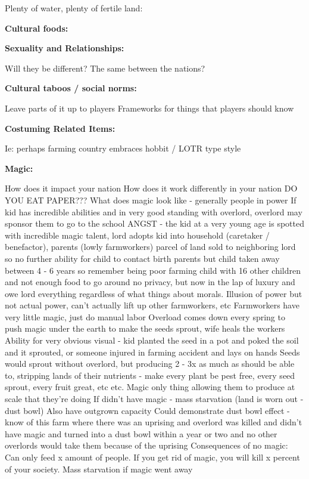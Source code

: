 \documentclass[blue]{GL2020}
\begin{document}
Plenty of water, plenty of fertile land:

\textbf{Cultural foods:}

\textbf{Sexuality and Relationships:}

Will they be different? The same between the nations?

\textbf{Cultural taboos / social norms:}

Leave parts of it up to players
Frameworks for things that players should know

\textbf{Costuming Related Items:}

Ie: perhaps farming country embraces hobbit / LOTR type style

\textbf{Magic:}

How does it impact your nation
How does it work differently in your nation
DO YOU EAT PAPER???
What does magic look like - generally people in power
If kid has incredible abilities and in very good standing with overlord, overlord may sponsor them to go to the school
ANGST - the kid at a very young age is spotted with incredible magic talent, lord adopts kid into household (caretaker / benefactor), parents (lowly farmworkers) parcel of land sold to neighboring lord so no further ability for child to contact birth parents but child taken away between 4 - 6 years so remember being poor farming child with 16 other children and not enough food to go around no privacy, but now in the lap of luxury and owe lord everything regardless of what things about morals.  
Illusion of power but not actual power, can’t actually lift up other farmworkers, etc
Farmworkers have very little magic, just do manual labor
Overload comes down every spring to push magic under the earth to make the seeds sprout, wife heals the workers
Ability for very obvious visual - kid planted the seed in a pot and poked the soil and it sprouted, or someone injured in farming accident and lays on hands
Seeds would sprout without overlord, but producing 2 - 3x as much as should be able to, stripping lands of their nutrients - make every plant be pest free, every seed sprout, every fruit great, etc etc.  Magic only thing allowing them to produce at scale that they’re doing
If didn’t have magic - mass starvation (land is worn out - dust bowl)  Also have outgrown capacity
Could demonstrate dust bowl effect - know of this farm where there was an uprising and overlord was killed and didn’t have magic and turned into a dust bowl within a year or two and no other overlords would take them because of the uprising
Consequences of no magic:
Can only feed x amount of people.  If you get rid of magic, you will kill x percent of your society.  Mass starvation if magic went away
\end{document}

